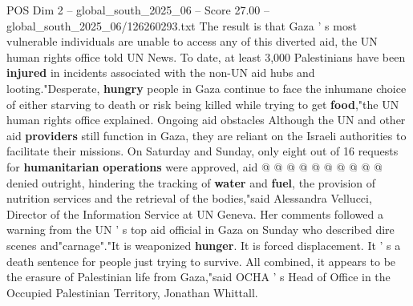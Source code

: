 \begin{textsample}{POS Dim 2 – global\_south\_2025\_06 – Score 27.00 – global\_south\_2025\_06/126260293.txt}
The result is that Gaza ' s most vulnerable individuals are unable to access any of this diverted aid, the UN human rights office told UN News.
To date, at least 3,000 Palestinians have been \textbf{injured} in incidents associated with the non-UN aid hubs and looting."Desperate, \textbf{hungry} people in Gaza continue to face the inhumane choice of either starving to death or risk being killed while trying to get \textbf{food},"the UN human rights office explained.
Ongoing aid obstacles Although the UN and other aid \textbf{providers} still function in Gaza, they are reliant on the Israeli authorities to facilitate their missions.
On Saturday and Sunday, only eight out of 16 requests for \textbf{humanitarian} \textbf{operations} were approved, aid @ @ @ @ @ @ @ @ @ @ denied outright, hindering the tracking of \textbf{water} and \textbf{fuel}, the provision of nutrition services and the retrieval of the bodies,"said Alessandra Vellucci, Director of the Information Service at UN Geneva.
Her comments followed a warning from the UN ' s top aid official in Gaza on Sunday who described dire scenes and"carnage"."It is weaponized \textbf{hunger}.
It is forced displacement.
It ' s a death sentence for people just trying to survive.
All combined, it appears to be the erasure of Palestinian life from Gaza,"said OCHA ' s Head of Office in the Occupied Palestinian Territory, Jonathan Whittall.

\end{textsample}
